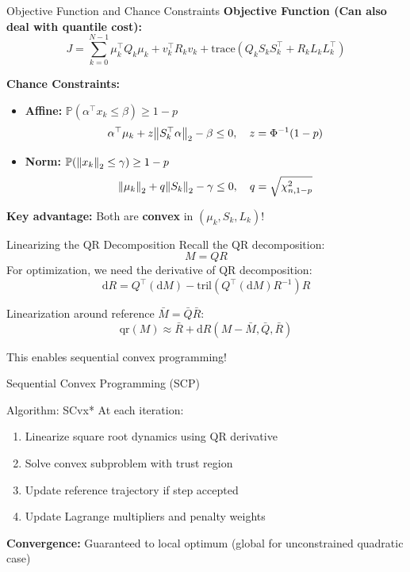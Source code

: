 \documentclass{beamer}
\begin{document}
\begin{frame}{Objective Function and Chance Constraints}
\textbf{Objective Function (Can also deal with quantile cost):}
\[
J = \sum_{k=0}^{N-1} \mu_k^\top Q_k \mu_k + v_k^\top R_k v_k + \mathrm{trace}(Q_k S_k S_k^\top + R_k L_k L_k^\top)
\]

\textbf{Chance Constraints:}
\begin{itemize}
    \item \textbf{Affine:} $\mathbb{P}(\alpha^\top x_k \leq \beta) \geq 1-p$
    \[
    \alpha^\top \mu_k + z \norm{S_k^\top \alpha}_2 - \beta \leq 0, \quad z = \Phi^{-1}(1-p)
    \]
    \item \textbf{Norm:} $\mathbb{P}(\norm{x_k}_2 \leq \gamma) \geq 1-p$
    \[
    \norm{\mu_k}_2 + q \norm{S_k}_2 - \gamma \leq 0, \quad q = \sqrt{\chi^2_{n,1-p}}
    \]
\end{itemize}

\textbf{Key advantage:} Both are \textbf{convex} in $(\mu_k, S_k, L_k)$!
\end{frame}


\begin{frame}{Linearizing the QR Decomposition}
Recall the QR decomposition:
\[
M = QR
\]
For optimization, we need the derivative of QR decomposition:
\[
\mathrm{d} R = Q^\top (\mathrm{d} M) - \mathrm{tril}(Q^\top (\mathrm{d} M) R^{-1}) R
\]

Linearization around reference $\bar{M} = \bar{Q} \bar{R}$:
\[
\mathrm{qr}(M) \approx \bar{R} + \mathrm{d} R(M - \bar{M}, \bar{Q}, \bar{R})
\]

This enables sequential convex programming!
\end{frame}

\begin{frame}{Sequential Convex Programming (SCP)}
\begin{block}{Algorithm: SCvx*}
At each iteration:
\begin{enumerate}
    \item Linearize square root dynamics using QR derivative
    \item Solve convex subproblem with trust region
    \item Update reference trajectory if step accepted
    \item Update Lagrange multipliers and penalty weights
\end{enumerate}
\end{block}

\vspace{0.3cm}
\textbf{Convergence:} Guaranteed to local optimum (global for unconstrained quadratic case)
\end{frame}
\end{document}
